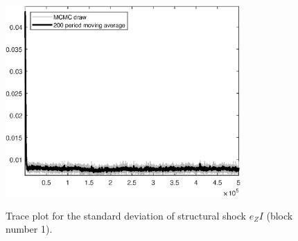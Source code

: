 \begin{figure}[H]
\centering
  \includegraphics[width=0.8\textwidth]{BRS_growth_ext_fd/graphs/TracePlot_SE_e_ZI_blck_1}\\
    \caption{Trace plot for the standard deviation of structural shock ${e_ZI}$ (block number 1).}
\end{figure}

